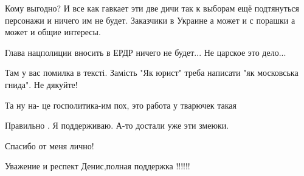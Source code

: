 \begin{itemize}
Кому выгодно? И все как гавкает эти две дичи так к выборам ещё подтянуться
персонажи и ничего им не будет. Заказчики в Украине а может и с порашки а может
и общие интересы.


 

Глава нацполиции вносить в ЕРДР ничего не будет... Не царское это дело...


 

Там у вас помилка в тексті. Замість "Як юрист" треба написати "як московська
гнида". Не дякуйте! \Smiley[1.0][yellow]

 
Та ну на- це госполитика-им пох, это работа у тварючек такая

 
Правильно . Я поддерживаю. А-то достали уже эти змеюки.

 
Спасибо от меня лично!

 
Уважение и респект Денис,полная поддержка !!!!!!


\end{itemize}
